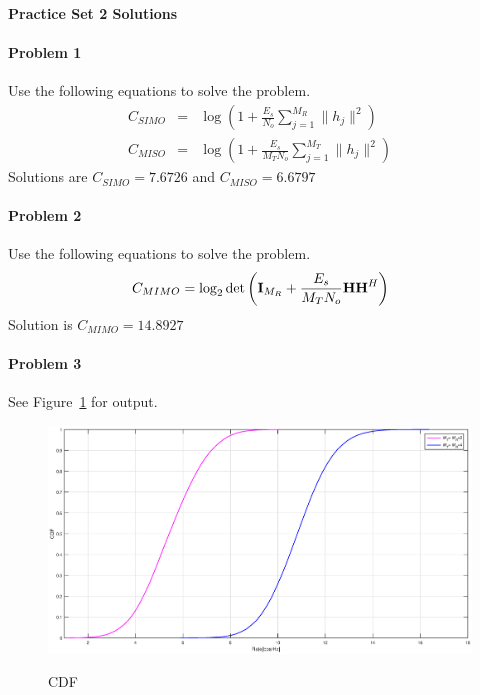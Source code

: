 \documentclass[12pt]{article}
\begin{document}
\begin{center}
\textbf{Practice Set 2 Solutions}
\end{center}
\paragraph{Problem 1}
Use the following equations to solve the problem.
\begin{eqnarray*}
C_{SIMO} &=& \log (1 + \frac{E_s}{N_o} \sum_{j=1}^{M_R} \|h_j\|^2)\\
C_{MISO} &=& \log (1 +  \frac{E_s}{M_T N_o}\sum_{j=1}^{M_T} \|h_j\|^2)
\end{eqnarray*}
Solutions are $C_{SIMO}=7.6726$ and $C_{MISO}=6.6797$
\paragraph{Problem 2}
Use the following equations to solve the problem.
\begin{eqnarray*}
 C_{MIMO} = \log_2\det\left({\bf I}_{M_R}+\frac{E_s}{M_TN_o}{\bf HH}^H \right)
\end{eqnarray*}
Solution is $C_{MIMO}=14.8927$ 
\paragraph{Problem 3}

See Figure~\ref{fig:cdf} for output.
\begin{figure}
    \centering
  \includegraphics[width=6.0in]{cdf.eps}\\
  \caption{CDF}\label{fig:cdf}
\end{figure}
\end{document}
